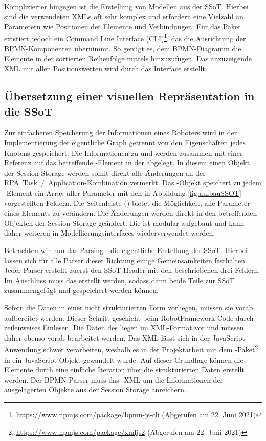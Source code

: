Komplizierter hingegen ist die Erstellung von Modellen aus der SSoT. Hierbei sind die verwendeten XMLs oft sehr komplex und erfordern eine Vielzahl an Parametern wie Positionen der Elemente und Verbindungen. Für das Paket  existiert jedoch ein Command Line Interface (CLI)\footnote{\url{https://www.npmjs.com/package/bpmn-js-cli} (Abgerufen am 22. Juni 2021)}, das die Ausrichtung der BPMN-Komponenten übernimmt. So genügt es, dem BPMN-Diagramm die Elemente in der sortierten Reihenfolge mittels  hinzuzufügen. Das anzuzeigende XML mit allen Positionswerten wird durch das Interface erstellt.  

\subsection{Übersetzung einer visuellen Repräsentation in die SSoT}

Zur einfacheren Speicherung der Informationen eines Roboters wird in der Implementierung der eigentliche Graph getrennt von den Eigenschaften jedes Knotens gespeichert. Die Informationen zu  und  werden zusammen mit einer Referenz auf das betreffende -Element in der  abgelegt. In diesem einen Objekt der Session Storage werden somit direkt alle Änderungen an der \mbox{RPA Task / Application-Kombination} vermerkt. Das -Objekt speichert zu jedem -Element ein Array aller Parameter mit den in Abbildung \ref{fig:aufbauSSOT} vorgestellten Feldern. Die Seitenleiste () bietet die Möglichkeit, alle Parameter eines Elements zu verändern. Die Änderungen werden direkt in den betreffenden Objekten der Session Storage geändert. Die  ist modular aufgebaut und kann daher weiteren in Modellierungsinterfaces wiederverwendet werden.

Betrachten wir nun das Parsing - die eigentliche Erstellung der SSoT. Hierbei lassen sich für alle Parser dieser Richtung einige Gemeinsamkeiten festhalten. Jeder Parser erstellt zuerst den SSoT-Header mit den beschriebenen drei Feldern. Im Anschluss muss das  erstellt werden, sodass dann beide Teile zur SSoT zusammengefügt und gespeichert werden können. 

Sofern die Daten in einer nicht strukturierten Form vorliegen, müssen sie vorab aufbereitet werden. Dieser Schritt geschieht beim RobotFramework Code durch zeilenweises Einlesen. Die Daten des  liegen im XML-Format vor und müssen daher ebenso vorab bearbeitet werden. Das XML lässt sich in der JavaScript Anwendung schwer verarbeiten, weshalb es in der Projektarbeit mit dem -Paket\footnote{\url{https://www.npmjs.com/package/xmljs2} (Abgerufen am 22. Juni 2021)} in ein JavaScript Objekt gewandelt wurde. Auf dieser Grundlage können die Elemente durch eine einfache Iteration über die strukturierten Daten erstellt werden. Der BPMN-Parser muss das -XML um die Informationen der ausgelagerten Objekte aus der Session Storage anreichern.  

